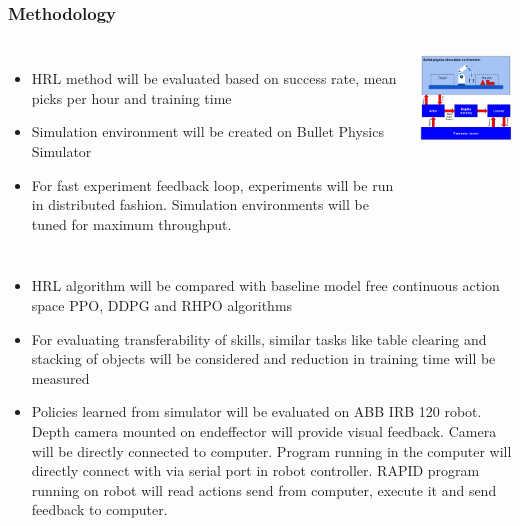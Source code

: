 \documentclass{beamer}
\begin{document}
	\begin{frame}[allowframebreaks]
		\frametitle{Methodology}
		
		\begin{columns}[c]
			\begin{itemize}
				\item HRL method will be evaluated based on success rate, mean picks per hour and training time
				\item Simulation environment will be created on Bullet Physics Simulator
				\item For fast experiment feedback loop, experiments will be run in distributed fashion. Simulation environments will be tuned for maximum throughput.
			\end{itemize}
			
			\includegraphics[width=6cm]{setup}
		\end{columns}
	

		\begin{itemize}
			\item HRL algorithm will be compared with baseline model free continuous action space PPO, DDPG and RHPO algorithms
			\item For evaluating transferability of skills, similar tasks like table clearing and stacking of objects will be considered and reduction in training time will be measured
			\item Policies learned from simulator will be evaluated on ABB IRB 120 robot. Depth camera mounted on endeffector will provide visual feedback. Camera will be directly connected to computer. Program running in the computer will directly connect with via serial port in robot controller. RAPID program running on robot will read actions send from computer, execute it and send feedback to computer.
		\end{itemize}
	\end{frame}
\end{document}
